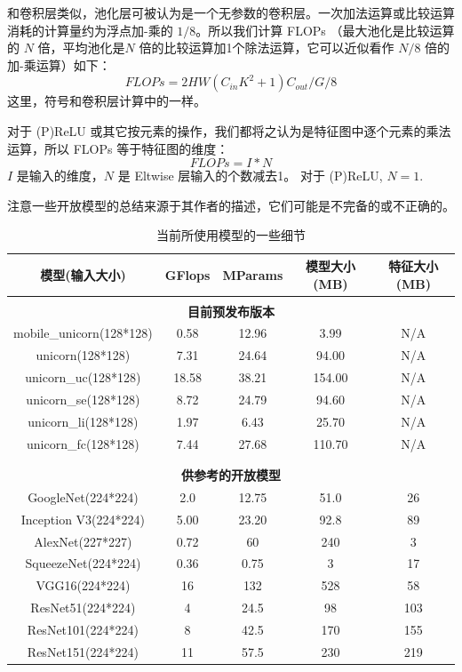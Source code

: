 \documentclass[a4paper, 11pt, UTF8]{ctexart}%
\begin{document}
和卷积层类似，池化层可被认为是一个无参数的卷积层。一次加法运算或比较运算消耗的计算量约为浮点加-乘的 $1/8$。所以我们计算 FLOPs （最大池化是比较运算的 $N$ 倍，平均池化是$N$ 倍的比较运算加1个除法运算，它可以近似看作 $N/8$ 倍的加-乘运算）如下：
\begin{equation}\label{Flops_pool}
  FLOPs = 2HW(C_{in}K^2+1)C_{out}/G/8
\end{equation}
这里，符号和卷积层计算中的一样。

对于 (P)ReLU 或其它按元素的操作，我们都将之认为是特征图中逐个元素的乘法运算，所以 FLOPs 等于特征图的维度：
\begin{equation}\label{Flops-eltwise}
  FLOPs = I * N
\end{equation}
$I$ 是输入的维度，$N$ 是 Eltwise 层输入的个数减去1。 对于 (P)ReLU, $N=1$.

注意一些开放模型的总结来源于其作者的描述，它们可能是不完备的或不正确的。

\begin{table}[h]
\caption{当前所使用模型的一些细节 }
\label{table:SD}
\begin{center}
\begin{tabular}{ccccc}
\multicolumn{1}{c}{\bf 模型(输入大小)}  &\multicolumn{1}{c}{\bf GFlops} &\multicolumn{1}{c}{\bf MParams} &\multicolumn{1}{c}{\bf 模型大小(MB)} &\multicolumn{1}{c}{\bf 特征大小(MB)}
\\ \hline \\
\multicolumn{5}{c}{\bf 目前预发布版本}\\
mobile\_unicorn(128*128) &  0.58 & 12.96 & 3.99 & N/A \\
unicorn(128*128) &  7.31 & 24.64 & 94.00 & N/A \\
unicorn\_uc(128*128) &  18.58 & 38.21 & 154.00 & N/A \\
unicorn\_se(128*128) &  8.72 & 24.79 & 94.60 & N/A \\
unicorn\_li(128*128) &  1.97 & 6.43 & 25.70  & N/A\\
unicorn\_fc(128*128) &  7.44 & 27.68 & 110.70 & N/A \\
\\ \hline \\
\multicolumn{5}{c}{\bf 供参考的开放模型}\\
GoogleNet(224*224) &  2.0 & 12.75 & 51.0 & 26 \\
Inception V3(224*224) &  5.00 & 23.20 & 92.8 & 89 \\
AlexNet(227*227) &  0.72 & 60 & 240 & 3 \\
SqueezeNet(224*224) &  0.36 & 0.75 & 3 & 17 \\
VGG16(224*224) &  16 & 132 & 528 & 58 \\
ResNet51(224*224) &  4 & 24.5 & 98 & 103 \\
ResNet101(224*224) &  8 & 42.5 & 170 & 155 \\
ResNet151(224*224) &  11 & 57.5 & 230 & 219 \\
\end{tabular}
\end{center}
\end{table}
\end{document}

